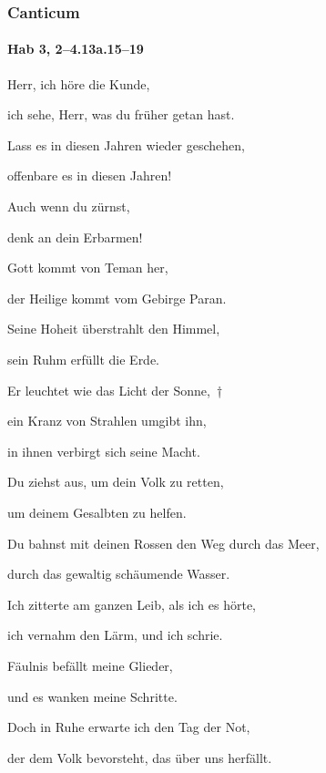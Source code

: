 \subsubsection{Canticum}

\paragraph{Hab 3, 2--4.13a.15--19}

\noindent Herr, ich höre die Kunde,~\GreStar{}~\nopagebreak

ich sehe, Herr, was du früher getan hast. 

\noindent Lass es in diesen Jahren wieder geschehen,~\GreStar{}~\nopagebreak

offenbare es in diesen Jahren! 

\noindent Auch wenn du zürnst,~\GreStar{}~\nopagebreak

denk an dein Erbarmen!

\noindent Gott kommt von Teman her,~\GreStar{}~\nopagebreak

der Heilige kommt vom Gebirge Paran. 

\noindent Seine Hoheit überstrahlt den Himmel,~\GreStar{}~\nopagebreak

sein Ruhm erfüllt die Erde.

\noindent Er leuchtet wie das Licht der Sonne,~†~\nopagebreak

ein Kranz von Strahlen umgibt ihn,~\GreStar{}~\nopagebreak

in ihnen verbirgt sich seine Macht.

\noindent Du ziehst aus, um dein Volk zu retten,~\GreStar{}~\nopagebreak

um deinem Gesalbten zu helfen.

\noindent Du bahnst mit deinen Rossen den Weg durch das Meer,~\GreStar{}~\nopagebreak

durch das gewaltig schäumende Wasser.

\noindent Ich zitterte am ganzen Leib, als ich es hörte,~\GreStar{}~\nopagebreak

ich vernahm den Lärm, und ich schrie. 

\noindent Fäulnis befällt meine Glieder,~\GreStar{}~\nopagebreak

und es wanken meine Schritte. 

\noindent Doch in Ruhe erwarte ich den Tag der Not,~\GreStar{}~\nopagebreak

der dem Volk bevorsteht, das über uns herfällt.

